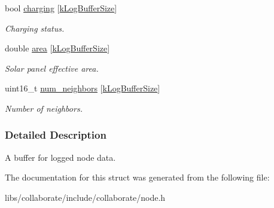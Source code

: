 \begin{DoxyCompactItemize}
\mbox{\label{structosse_1_1collaborate_1_1_node_1_1_log_buffer_add29887b3b0de412ab9b4ea228922d96}} 
bool \hyperlink{structosse_1_1collaborate_1_1_node_1_1_log_buffer_add29887b3b0de412ab9b4ea228922d96}{charging} \mbox{[}\hyperlink{classosse_1_1collaborate_1_1_node_ab547be97379bd04ed560971c0fd4f375}{k\+Log\+Buffer\+Size}\mbox{]}
\begin{DoxyCompactList}\small\item\em Charging status. \end{DoxyCompactList}\item 
\mbox{\label{structosse_1_1collaborate_1_1_node_1_1_log_buffer_aa461123d6deb0f83659e577796752cad}} 
double \hyperlink{structosse_1_1collaborate_1_1_node_1_1_log_buffer_aa461123d6deb0f83659e577796752cad}{area} \mbox{[}\hyperlink{classosse_1_1collaborate_1_1_node_ab547be97379bd04ed560971c0fd4f375}{k\+Log\+Buffer\+Size}\mbox{]}
\begin{DoxyCompactList}\small\item\em Solar panel effective area. \end{DoxyCompactList}\item 
\mbox{\label{structosse_1_1collaborate_1_1_node_1_1_log_buffer_afe8361e4a164ff69a6309b93acc646b0}} 
uint16\+\_\+t \hyperlink{structosse_1_1collaborate_1_1_node_1_1_log_buffer_afe8361e4a164ff69a6309b93acc646b0}{num\+\_\+neighbors} \mbox{[}\hyperlink{classosse_1_1collaborate_1_1_node_ab547be97379bd04ed560971c0fd4f375}{k\+Log\+Buffer\+Size}\mbox{]}
\begin{DoxyCompactList}\small\item\em Number of neighbors. \end{DoxyCompactList}\end{DoxyCompactItemize}


\subsubsection{Detailed Description}
A buffer for logged node data. 

The documentation for this struct was generated from the following file\+:\begin{DoxyCompactItemize}
\item 
libs/collaborate/include/collaborate/node.\+h\end{DoxyCompactItemize}
